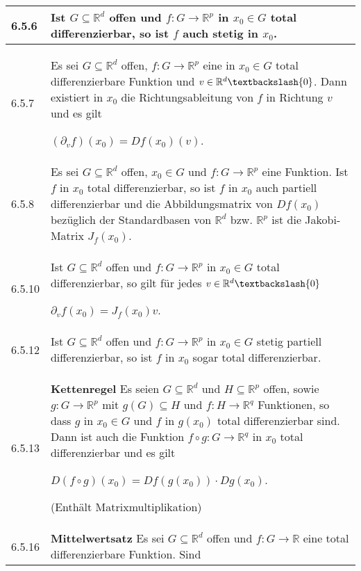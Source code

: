    \begin{longtable}{p{1cm} p{16cm}}
        \toprule

        6.5.6 & Ist $G \subseteq \mathbb{R}^d$ offen und $f: G\rightarrow \mathbb{R}^p$ in $x_0 \in G$ total differenzierbar, so ist $f$ auch
                stetig in $x_0$. \\
        \midrule
        6.5.7 & Es sei $G \subseteq \mathbb{R}^d$ offen, $f: G \rightarrow \mathbb{R}^p$ eine in $x_0 \in G$ total differenzierbare Funktion und
                $v \in \mathbb{R}^d \textbackslash \{0\}$. Dann existiert in $x_0$ die Richtungsableitung von $f$ in Richtung $v$ und es gilt \hfill \break
                \centerline{$ (\partial_vf)(x_0) = Df(x_0)(v)$.} \\
        \midrule
        6.5.8 & Es sei $G \subseteq \mathbb{R}^d$ offen, $x_0 \in G$ und $f: G \rightarrow \mathbb{R}^p$ eine Funktion. Ist $f$ in $x_0$ total
                differenzierbar, so ist $f$ in $x_0$ auch partiell differenzierbar und die Abbildungsmatrix von $Df(x_0)$ bezüglich der Standardbasen
                von $\mathbb{R}^d$ bzw. $\mathbb{R}^p$ ist die Jakobi-Matrix $J_f(x_0)$. \\
        \midrule
        6.5.10& Ist $G \subseteq \mathbb{R}^d$ offen und $f: G\rightarrow \mathbb{R}^p$ in $x_0 \in G$ total differenzierbar, so gilt für jedes
                $ v \in \mathbb{R}^d \textbackslash \{0\}$ \hfill \break
                \centerline{$ \partial_vf(x_0) = J_f(x_0)v $.} \\
        \midrule
        6.5.12& Ist $G \subseteq \mathbb{R}^d$ offen und $f: G\rightarrow \mathbb{R}^p$ in $x_0 \in G$ stetig partiell differenzierbar, so ist
                $f$ in $x_0$ sogar total differenzierbar. \\
        \midrule
        6.5.13& \textbf{Kettenregel} \hfill \break
                Es seien $G \subseteq \mathbb{R}^d$ und $H \subseteq \mathbb{R}^p$ offen, sowie $g : G\rightarrow \mathbb{R}^p$ mit $g(G) \subseteq H$
                und $f: H \rightarrow \mathbb{R}^q$ Funktionen, so dass $g$ in $x_0 \in G$ und $f$ in $g(x_0)$ total differenzierbar sind. Dann ist 
                auch die Funktion $f \circ g : G \rightarrow \mathbb{R}^q$ in $x_0$ total differenzierbar und es gilt \hfill \break
                \centerline{$ D(f\circ g)(x_0) = Df(g(x_0)) \cdot Dg(x_0) $.} 
                (Enthält Matrixmultiplikation)\\
        \midrule
        6.5.16& \textbf{Mittelwertsatz} \hfill \break
                Es sei $G \subseteq \mathbb{R}^d$ offen und $f : G \rightarrow \mathbb{R}$ eine total differenzierbare Funktion. Sind 

\end{longtable}
